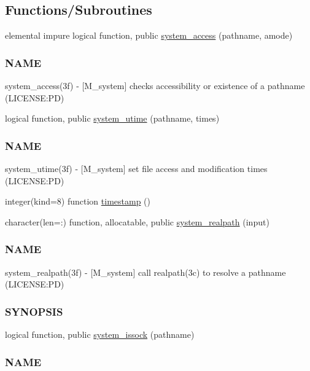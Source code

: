 \subsection*{Functions/\+Subroutines}
\begin{DoxyCompactItemize}
\item 
elemental impure logical function, public \mbox{\hyperlink{namespacem__system_a4c1c906730e61629a8277e1daeda90f6}{system\+\_\+access}} (pathname, amode)
\begin{DoxyCompactList}\small\item\em \subsubsection*{N\+A\+ME}

system\+\_\+access(3f) -\/ \mbox{[}M\+\_\+system\mbox{]} checks accessibility or existence of a pathname (L\+I\+C\+E\+N\+SE\+:PD) \end{DoxyCompactList}\item 
logical function, public \mbox{\hyperlink{namespacem__system_a83a121ba0b525210b5217565569ef350}{system\+\_\+utime}} (pathname, times)
\begin{DoxyCompactList}\small\item\em \subsubsection*{N\+A\+ME}

system\+\_\+utime(3f) -\/ \mbox{[}M\+\_\+system\mbox{]} set file access and modification times (L\+I\+C\+E\+N\+SE\+:PD) \end{DoxyCompactList}\item 
integer(kind=8) function \mbox{\hyperlink{namespacem__system_a635baf5850927faa97461afaca512235}{timestamp}} ()
\item 
character(len=\+:) function, allocatable, public \mbox{\hyperlink{namespacem__system_a70bbfa0a0be084b9717cbc04408041fc}{system\+\_\+realpath}} (input)
\begin{DoxyCompactList}\small\item\em \subsubsection*{N\+A\+ME}

system\+\_\+realpath(3f) -\/ \mbox{[}M\+\_\+system\mbox{]} call realpath(3c) to resolve a pathname (L\+I\+C\+E\+N\+SE\+:PD) \subsubsection*{S\+Y\+N\+O\+P\+S\+IS}\end{DoxyCompactList}\item 
logical function, public \mbox{\hyperlink{namespacem__system_af6eb5074fe74552bc7a5e7d00f459087}{system\+\_\+issock}} (pathname)
\begin{DoxyCompactList}\small\item\em \subsubsection*{N\+A\+ME}


\end{DoxyCompactList}
\end{DoxyCompactItemize}
